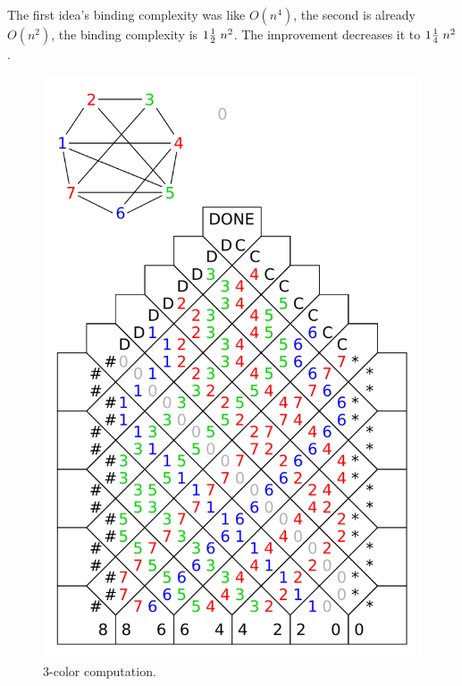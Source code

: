 The first idea's binding complexity was like $O(n^4)$, the second is already $O(n^2)$, the binding complexity is $1\nicefrac{1}{2}\;n^2$. The improvement decreases it to $1\nicefrac{1}{4}\;n^2$.

\begin{figure}[H]
\begin{center}
	\includegraphics[scale=0.75]{./figures/3-color/3-color.pdf}
	\caption{3-color computation.}
	\label{fig:3-color}
\end{center}
\end{figure}
